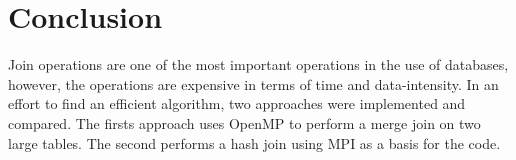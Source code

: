 \documentclass[journal,draftclsnofoot]{IEEEtran}
\begin{document}
\section{Conclusion}\label{conc}
Join operations are one of the most important operations in the use of databases, however, the operations are expensive in terms of time and data-intensity. In an effort to find an efficient algorithm, two approaches were implemented and compared. The firsts approach uses OpenMP to perform a merge join on two large tables. The second performs a hash join using MPI as a basis for the code.


\cleardoublepage
\onecolumn
\end{document}

